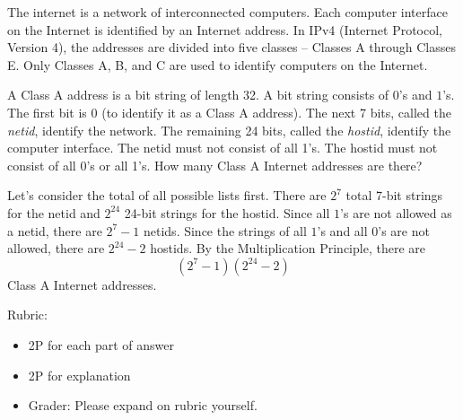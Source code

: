 \documentclass{article}
\theoremstyle{definition}
\begin{document}
\begin{question}
    The internet is a network of interconnected computers. Each computer interface on the Internet is identified by an Internet address. In IPv4 (Internet Protocol, Version 4), the addresses are divided into five classes -- Classes A through Classes E. Only Classes A, B, and C are used to identify computers on the Internet.
    
    A Class A address is a bit string of length 32. A bit string consists of $0$'s and $1$'s. The first bit is 0 (to identify it as a Class A address). The next 7 bits, called the \textit{netid}, identify the network. The remaining 24 bits, called the \textit{hostid}, identify the computer interface. The netid must not consist of all 1's. The hostid must not consist of all 0's or all 1's. How many Class A Internet addresses are there?
\end{question}
\begin{solution}
Let's consider the total of all possible lists first. There are $2^7$ total 7-bit strings for the netid and $2^{24}$ 24-bit strings for the hostid. Since all $1$'s are not allowed as a netid, there are $2^7-1$ netids. Since the strings of all $1$'s and all $0$'s are not allowed, there are $2^{24}-2$ hostids. By the Multiplication Principle, there are 
\[
(2^7-1)(2^{24}-2)
\]
Class A Internet addresses.
{\color{red} Rubric:
\begin{itemize}
\item 2P for each part of answer
\item 2P for explanation
\item Grader: Please expand on rubric yourself.
\end{itemize}}
\end{solution}
\end{document}
